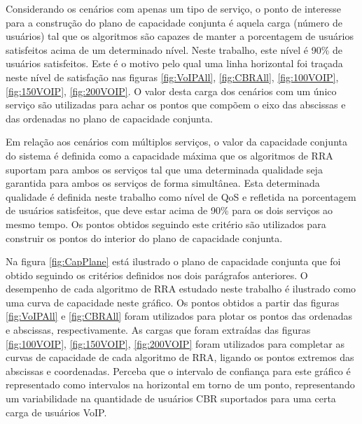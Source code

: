 Considerando os cenários com apenas um tipo de serviço, o ponto de interesse para a construção do plano de capacidade conjunta é aquela carga (número de usuários) tal que os algoritmos são capazes de manter a porcentagem de usuários satisfeitos acima de um determinado nível. 
Neste trabalho, este nível é 90\% de usuários satisfeitos. Este é o motivo pelo qual uma linha horizontal foi traçada neste nível de satisfação nas figuras \ref{fig:VoIPAll}, \ref{fig:CBRAll}, \ref{fig:100VOIP}, \ref{fig:150VOIP}, \ref{fig:200VOIP}. O valor desta carga dos cenários com um único serviço são utilizadas para achar os pontos que compõem o eixo das abscissas e das ordenadas no plano de capacidade conjunta.

Em relação aos cenários com múltiplos serviços, o valor da capacidade conjunta do sistema é definida como a capacidade máxima que os algoritmos de RRA suportam para ambos os serviços tal que uma determinada qualidade seja garantida para ambos os serviços de forma simultânea. Esta determinada qualidade é definida neste trabalho como nível de QoS e refletida na porcentagem de usuários satisfeitos, que deve estar acima de 90\% para os dois serviços ao mesmo tempo. Os pontos obtidos seguindo este critério são utilizados para construir os pontos do interior do plano de capacidade conjunta.

Na figura \ref{fig:CapPlane} está ilustrado o plano de capacidade conjunta que foi obtido seguindo os critérios definidos nos dois parágrafos anteriores. O desempenho de cada algoritmo de RRA estudado neste trabalho é ilustrado como uma curva de capacidade neste gráfico. Os pontos obtidos a partir das figuras  \ref{fig:VoIPAll} e \ref{fig:CBRAll} foram utilizados para plotar os pontos das ordenadas e abscissas, respectivamente. As cargas que foram extraídas das figuras \ref{fig:100VOIP}, \ref{fig:150VOIP}, \ref{fig:200VOIP} foram utilizados para completar as curvas de capacidade de cada algoritmo de RRA, ligando os pontos extremos das abscissas e coordenadas. Perceba que o intervalo de confiança para este gráfico é representado como intervalos na horizontal em torno de um ponto, representando um variabilidade na quantidade de usuários CBR suportados para uma certa carga de usuários VoIP.

